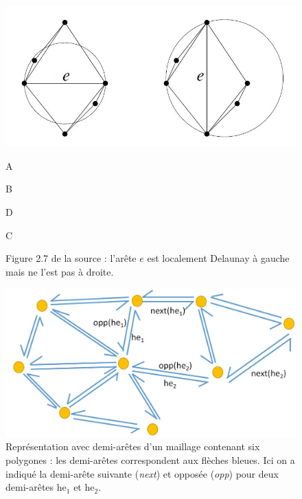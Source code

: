 \documentclass[12pt,a4paper]{report}
\begin{document}
\begin{figure}[h]
\begin{center}
\includegraphics[scale=0.65]{locDel.jpg}
\caption{Figure 2.7 de la source \cite{delnotes} : l'arête $e$ est localement Delaunay à gauche mais ne l'est pas à droite.}\label{locDelaunay}\vspace{-3.5cm}\hspace{-10cm}A

\vspace*{1.2cm}\hspace{-6cm}B

\vspace*{-5.2cm}\hspace{-6cm}D

\vspace*{2cm}\hspace{-2.7cm}C
\end{center}
\end{figure}


\begin{figure}[htbp]
\begin{center}
\includegraphics[scale=0.5]{halfEdge.jpg}
\caption{Représentation avec demi-arêtes d'un maillage contenant six polygones : les demi-arêtes correspondent aux flèches bleues. Ici on a indiqué la demi-arête suivante (\emph{next}) et opposée (\emph{opp}) pour deux demi-arêtes $\mathrm{he}_1$ et $\mathrm{he}_2$.}
\label{half_edge}
\end{center}
\end{figure}
\end{document}
